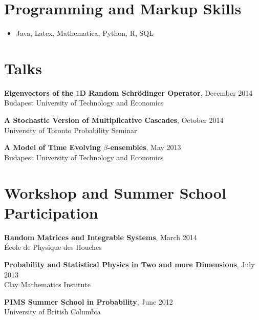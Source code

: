 \documentclass[margin,line]{res}
\begin{document}
\begin{resume}
\section{\sc Programming and Markup Skills}
\begin{itemize}
\item Java, Latex, Mathematica, Python, R, SQL
\end{itemize}

\vspace{0.2in}

\section{\sc Talks}
{\bf Eigenvectors of the $1$D Random Schr\"odinger Operator}, December 2014 \\
Budapest University of Technology and Economics

{\bf A Stochastic Version of Multiplicative Cascades}, October 2014 \\
University of Toronto Probability Seminar \\
\vspace{-0.5cm}

{\bf A Model of Time Evolving $\beta$-ensembles}, May 2013\\
Budapest University of Technology and Economics\\
\vspace{-0.5 cm}

\section{\sc Workshop and Summer School Participation}
{\bf Random Matrices and Integrable Systems}, March 2014 \\
\'{E}cole de Physique des Houches\\
\vspace{-0.5cm}

{\bf Probability and Statistical Physics in Two and more Dimensions}, July 2013\\
Clay Mathematics Institute\\
\vspace{-0.5cm}

{\bf PIMS Summer School in Probability}, June 2012 \\
University of British Columbia





\end{resume}
\end{document}
